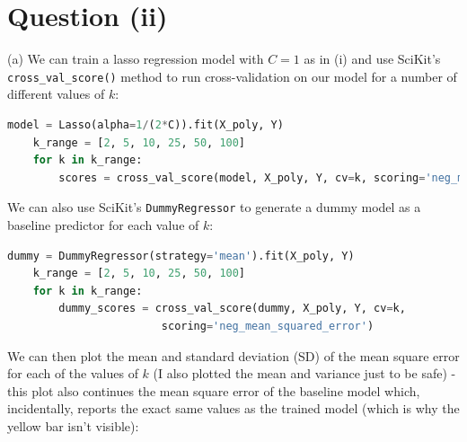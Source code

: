 \documentclass[12pt]{article}
\begin{document}
\section*{Question (ii)}

\noindent (a) We can train a lasso regression model with $C = 1$ as in (i) and use SciKit's \texttt{cross\_val\_score()} method to run cross-validation on our model for a number of different values of $k$:

\begin{center}
    \lstset{basicstyle=\footnotesize}
    \begin{lstlisting}[language=Python]
    model = Lasso(alpha=1/(2*C)).fit(X_poly, Y)
    k_range = [2, 5, 10, 25, 50, 100]
    for k in k_range:
        scores = cross_val_score(model, X_poly, Y, cv=k, scoring='neg_mean_squared_error')
    \end{lstlisting}
\end{center}

We can also use SciKit's \texttt{DummyRegressor} to generate a dummy model as a baseline predictor for each value of $k$:

\begin{center}
    \lstset{basicstyle=\footnotesize}
    \begin{lstlisting}[language=Python]
    dummy = DummyRegressor(strategy='mean').fit(X_poly, Y)
    k_range = [2, 5, 10, 25, 50, 100]
    for k in k_range:
        dummy_scores = cross_val_score(dummy, X_poly, Y, cv=k,
                        scoring='neg_mean_squared_error')
    \end{lstlisting}
\end{center}

We can then plot the mean and standard deviation (SD) of the mean square error for each of the values of $k$ (I also plotted the mean and variance just to be safe) - this plot also continues the mean square error of the baseline model which, incidentally, reports the exact same values as the trained model (which is why the yellow bar isn't visible):
\end{document}
